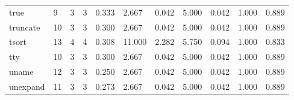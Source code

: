 \begin{longtable}{lp{1.2cm}p{1.2cm}p{1.2cm}p{1.2cm}p{1.2cm}p{1.2cm}p{1.2cm}p{1.2cm}p{1.2cm}p{1.2cm}}
true      &                            9 &                  3 &                                 3 &                                      0.333 &                                  2.667 &                                        0.042 &                             5.000 &                                   0.042 &                              1.000 &                                              0.889 \\
truncate  &                           10 &                  3 &                                 3 &                                      0.300 &                                  2.667 &                                        0.042 &                             5.000 &                                   0.042 &                              1.000 &                                              0.889 \\
tsort     &                           13 &                  4 &                                 4 &                                      0.308 &                                 11.000 &                                        2.282 &                             5.750 &                                   0.094 &                              1.000 &                                              0.833 \\
tty       &                           10 &                  3 &                                 3 &                                      0.300 &                                  2.667 &                                        0.042 &                             5.000 &                                   0.042 &                              1.000 &                                              0.889 \\
uname     &                           12 &                  3 &                                 3 &                                      0.250 &                                  2.667 &                                        0.042 &                             5.000 &                                   0.042 &                              1.000 &                                              0.889 \\
unexpand  &                           11 &                  3 &                                 3 &                                      0.273 &                                  2.667 &                                        0.042 &                             5.000 &                                   0.042 &                              1.000 &                                              0.889 \\

\end{longtable}
